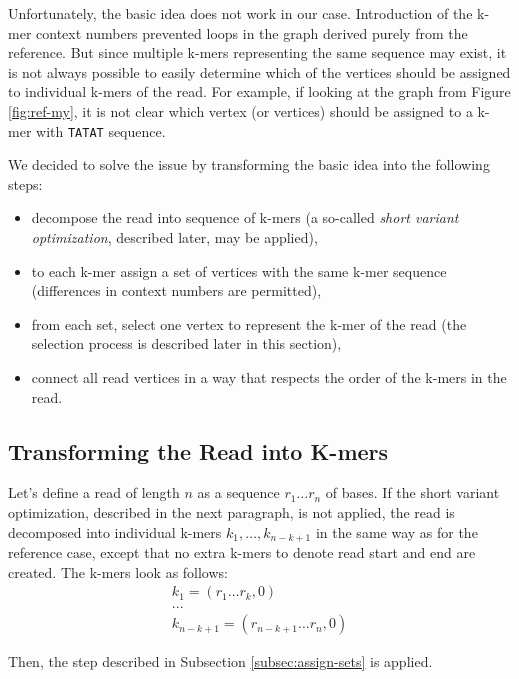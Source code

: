 Unfortunately, the basic idea does not work in our case. Introduction of the k-mer context numbers prevented loops in the graph derived purely from the reference. But since multiple k-mers representing the same sequence may exist, it is not always possible to easily determine which of the vertices should be assigned to individual k-mers of the read. For example, if looking at the graph from Figure \ref{fig:ref-my}, it is not clear which vertex (or vertices) should be assigned to a k-mer with \texttt{TATAT} sequence. 

We decided to solve the issue by transforming the basic idea into the following steps:
\begin{itemize}
\item decompose the read into sequence of k-mers (a so-called \textit{short variant optimization}, described later, may be applied),
\item to each k-mer assign a set of vertices with the same k-mer sequence (differences in context numbers are permitted),
\item from each set, select one vertex to represent the k-mer of the read (the selection process is described later in this section),
\item connect all read vertices in a way that respects the order of the k-mers in the read.
\end{itemize}

\subsection{Transforming the Read into K-mers}
\label{subsec:transforming-the-read-info-k-mers}

Let's define a read of length $n$ as a sequence $r_1 \ldots r_n$ of bases. If the short variant optimization, described in the next paragraph, is not applied, the read is decomposed into individual k-mers $k_1, \ldots , k_{n-k+1}$ in the same way as for the reference case, except that no extra k-mers to denote read start and end are created. The k-mers look as follows:
\begin{align*}
k_1 = (r_1 \ldots r_k, 0) \\
... \\
k_{n-k+1} = (r_{n-k+1} \ldots r_n, 0)
\end{align*}

Then, the step described in Subsection \ref{subsec:assign-sets} is applied.

